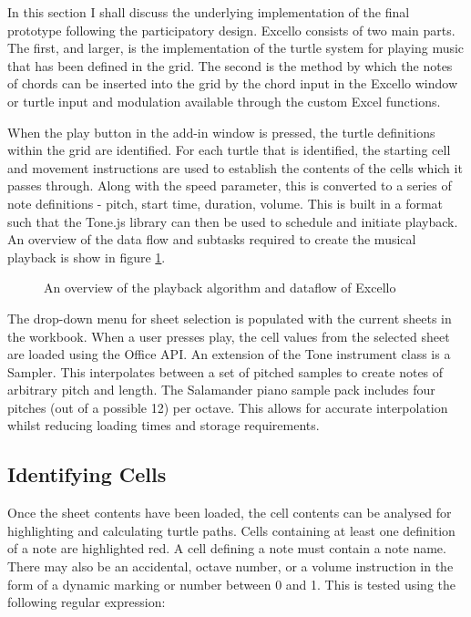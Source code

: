 In this section I shall discuss the underlying implementation of the final prototype following the participatory design. Excello consists of two main parts. The first, and larger, is the implementation of the turtle system for playing music that has been defined in the grid. The second is the method by which the notes of chords can be inserted into the grid by the chord input in the Excello window or turtle input and modulation available through the custom Excel functions.

When the play button in the add-in window is pressed, the turtle definitions within the grid are identified. For each turtle that is identified, the starting cell and movement instructions are used to establish the contents of the cells which it passes through. Along with the speed parameter, this is converted to a series of note definitions - pitch, start time, duration, volume. This is built in a format such that the Tone.js library can then be used to schedule and initiate playback. An overview of the data flow and subtasks required to create the musical playback is show in figure \ref{fig:overview}.

\begin{figure}[tbh]
\begin{center}

\end{center}
\caption{An overview of the playback algorithm and dataflow of Excello}
\label{fig:overview}
\end{figure}

The drop-down menu for sheet selection is populated with the current sheets in the workbook. When a user presses play, the cell values from the selected sheet are loaded using the Office API. An extension of the Tone instrument class is a Sampler. This interpolates between a set of pitched samples to create notes of arbitrary pitch and length. The Salamander piano sample pack includes four pitches (out of a possible 12) per octave. This allows for accurate interpolation whilst reducing loading times and storage requirements.

\subsection{Identifying Cells}

Once the sheet contents have been loaded, the cell contents can be analysed for highlighting and calculating turtle paths. Cells containing at least one definition of a note are highlighted red. A cell defining a note must contain a note name. There may also be an accidental, octave number, or a volume instruction in the form of a dynamic marking or number between 0 and 1. This is tested using the following regular expression:

